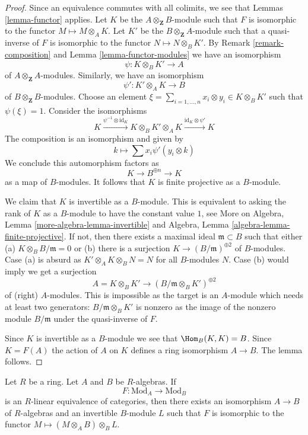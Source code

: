 \begin{proof}
Since an equivalence commutes with all colimits, we see that
Lemmas \ref{lemma-functor} applies. Let $K$ be the
$A \otimes_\mathbf{Z} B$-module such that $F$ is
isomorphic to the functor $M \mapsto M \otimes_A K$.
Let $K'$ be the $B \otimes_\mathbf{Z} A$-module such that
a quasi-inverse of $F$ is
isomorphic to the functor $N \mapsto N \otimes_B K'$.
By Remark \ref{remark-composition} and
Lemma \ref{lemma-functor-modules} we have an isomorphism
$$
\psi : K \otimes_B K' \longrightarrow A
$$
of $A \otimes_\mathbf{Z} A$-modules.
Similarly, we have an isomorphism
$$
\psi' : K' \otimes_A K \longrightarrow B
$$
of $B \otimes_\mathbf{Z} B$-modules. Choose an element
$\xi = \sum_{i = 1, \ldots, n} x_i \otimes y_i \in K \otimes_B K'$
such that $\psi(\xi) = 1$. Consider the isomorphisms
$$
K \xrightarrow{\psi^{-1} \otimes \text{id}_K}
K \otimes_B K' \otimes_A K \xrightarrow{\text{id}_K \otimes \psi'} K
$$
The composition is an isomorphism and given by
$$
k \longmapsto \sum x_i \psi'(y_i \otimes k)
$$
We conclude this automorphism factors as
$$
K \to B^{\oplus n} \to K
$$
as a map of $B$-modules. It follows that $K$ is finite
projective as a $B$-module.

\medskip\noindent
We claim that $K$ is invertible as a $B$-module. This is equivalent
to asking the rank of $K$ as a $B$-module to have the constant value $1$,
see More on Algebra, Lemma \ref{more-algebra-lemma-invertible} and
Algebra, Lemma \ref{algebra-lemma-finite-projective}.
If not, then there exists a maximal ideal $\mathfrak m \subset B$
such that either (a) $K \otimes_B B/\mathfrak m = 0$ or
(b) there is a surjection $K \to (B/\mathfrak m)^{\oplus 2}$ of
$B$-modules. Case (a) is absurd as $K' \otimes_A K \otimes_B N = N$
for all $B$-modules $N$. Case (b) would imply we get a surjection
$$
A = K \otimes_B K' \longrightarrow (B/\mathfrak m \otimes_B K')^{\oplus 2}
$$
of (right) $A$-modules. This is impossible as the target is an $A$-module
which needs at least two generators: $B/\mathfrak m \otimes_B K'$
is nonzero as the image of the nonzero module $B/\mathfrak m$ under
the quasi-inverse of $F$.

\medskip\noindent
Since $K$ is invertible as a $B$-module we see that $\Hom_B(K, K) = B$.
Since $K = F(A)$ the action of $A$ on $K$ defines a ring isomorphism
$A \to B$. The lemma follows.
\end{proof}

\begin{lemma}
\label{lemma-functor-equivalence-linear}
Let $R$ be a ring. Let $A$ and $B$ be $R$-algebras. If
$$
F : \text{Mod}_A \longrightarrow \text{Mod}_B
$$
is an $R$-linear equivalence of categories, then there exists an isomorphism
$A \to B$ of $R$-algebras and an invertible $B$-module $L$ such that
$F$ is isomorphic to the functor $M \mapsto (M \otimes_A B) \otimes_B L$.
\end{lemma}

